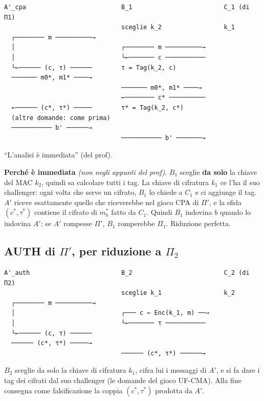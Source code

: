 \begin{verbatim}
A'_cpa                          B_1                         C_1 (di Π1)
                                sceglie k_2                 k_1
  ┌──────── m ──────────→
  │                             ┌──────── m ──────────→
  │                             └←─────── c ───────────
  └←────── (c, τ) ──────        τ = Tag(k_2, c)
  ─────── m0*, m1* ────→
                                ─────── m0*, m1* ────→
                                ←──────── c* ──────────
  ←────── (c*, τ*) ─────        τ* = Tag(k_2, c*)
  (altre domande: come prima)
  ─────────── b' ──────→
                                ─────────── b' ───────→
\end{verbatim}

``L'analisi è immediata'' (del prof).

\begin{nota}
\textbf{Perché è immediata} \emph{(non negli appunti del prof)}. \(B_1\) sceglie \textbf{da solo} la chiave del MAC \(k_2\), quindi sa calcolare tutti i tag. La chiave di cifratura \(k_1\) ce l'ha il suo challenger: ogni volta che serve un cifrato, \(B_1\) lo chiede a \(C_1\) e ci aggiunge il tag. \(A'\) riceve esattamente quello che riceverebbe nel gioco CPA di \(\Pi'\), e la sfida \((c^*, \tau^*)\) contiene il cifrato di \(m_b^*\) fatto da \(C_1\). Quindi \(B_1\) indovina \(b\) quando lo indovina \(A'\): se \(A'\) rompesse \(\Pi'\), \(B_1\) romperebbe \(\Pi_1\). Riduzione perfetta.
\end{nota}

\subsection{AUTH di \texorpdfstring{\(\Pi'\)}{Pi'}, per riduzione a \texorpdfstring{\(\Pi_2\)}{Pi2}}

\begin{verbatim}
A'_auth                         B_2                         C_2 (di Π2)
                                sceglie k_1                 k_2
  ┌──────── m ──────────→
  │                             ┌─── c ← Enc(k_1, m) ──→
  │                             └←─────── τ ───────────
  └←────── (c, τ) ──────
  ────── (c*, τ*) ─────→
                                ────── (c*, τ*) ──────→
\end{verbatim}

\(B_2\) sceglie da solo la chiave di cifratura \(k_1\), cifra lui i messaggi di \(A'\), e si fa dare i tag dei cifrati dal suo challenger (le domande del gioco UF-CMA). Alla fine consegna come falsificazione la coppia \((c^*, \tau^*)\) prodotta da \(A'\).

